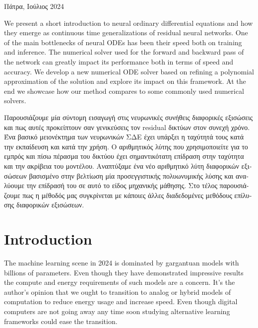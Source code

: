 \documentclass[11pt]{report}
\begin{document}
\begin{titlepage}
\begin{center}
{                \vfill
                Πάτρα, Ιούλιος 2024
            }
        \end{center}


    \end{titlepage}


    \abstract
    We present a short introduction to neural ordinary differential equations and how they emerge as continuous time
    generalizations of residual neural networks.
    One of the main bottlenecks of neural ODEs has been their speed both on training and inference.
    The numerical solver used for the forward and backward pass of the network can greatly impact its performance both
    in terms of speed and accuracy.
    We develop a new numerical ODE solver based on refining a polynomial approximation of the solution and explore its
    impact on this framework.
    At the end we showcase how our method compares to some commonly used numerical solvers.

    \begin{greek}
        \abstract
        Παρουσιάζουμε μία σύντομη εισαγωγή στις νευρωνικές συνήθεις διαφορικές εξισώσεις και πως αυτές προκείπτουν σαν
        γενικεύσεις τον residual δικτύων στον συνεχή χρόνο.
        Ένα βασικό μειονέκτημα των νευρωνικών ΣΔΕ έχει υπάρξει η ταχύτητά τους κατά την εκπαίδευση και κατά την χρήση.
        Ο αριθμητικός λύτης που χρησιμοποιείτε για το εμπρός και πίσω πέρασμα του δικτύου έχει σημαντικότατη επίδραση
        στην ταχύτητα και την ακρίβεια του μοντέλου.
        Αναπτύξαμε ένα νέο αριθμητικό λύτη διαφορικών εξισώσεων βασισμένο στην
        βελτίωση μία προσεγγιστικής πολυωνυμικής λύσης και αναλύουμε την επίδρασή του σε αυτό το είδος μηχανικής μάθησης.
        Στο τέλος παρουσιάζουμε πως η μέθοδός μας συγκρίνεται με κάποιες άλλες διαδεδομένες μεθόδους επίλυσης διαφορικών εξισώσεων.
    \end{greek}
    \thispagestyle{empty}
    \listoffigures
    \listoftables
    \newpage

    \tableofcontents


    \chapter{Introduction} \label{ch:intro}
    The machine learning scene in 2024 is dominated by gargantuan models with billions of parameters.
    Even though they have demonstrated impressive results the compute and energy requirements of such models are a
    concern.
    It's the author's opinion that we ought to transition to analog or hybrid models of computation to reduce energy
    usage and increase speed.
    Even though digital computers are not going away any time soon studying alternative learning frameworks could ease
    the transition.
\end{document}
